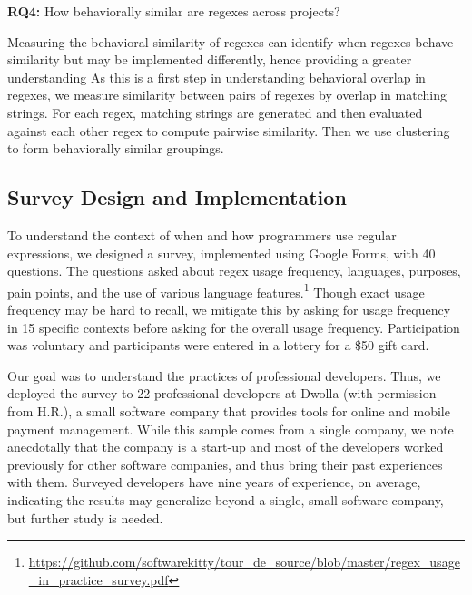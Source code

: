 \noindent \textbf{RQ4:} How behaviorally similar are regexes across projects?

Measuring the behavioral similarity of regexes can identify when regexes  behave similarity but may be implemented differently, hence providing a greater understanding 
As this is a first step in understanding behavioral overlap in
regexes, we measure similarity between pairs of regexes by overlap in matching strings. For each regex, matching strings are generated and then  evaluated against each other regex to compute pairwise similarity. Then we use clustering to form behaviorally similar groupings.

\subsection{Survey Design and Implementation}
\label{study:survey}
To understand the context of when and how programmers use regular expressions,
we designed a survey, implemented using Google Forms, with 40 questions. The questions asked about regex usage frequency, languages, purposes, pain points, and the use of various language
features.\footnote{\url{https://github.com/softwarekitty/tour_de_source/blob/master/regex_usage_in_practice_survey.pdf}}  Though exact usage frequency may be hard to recall, we mitigate this by asking for usage frequency in 15 specific contexts before asking for the overall usage frequency.
Participation was voluntary and participants were entered in a lottery for a \$50 gift card.

Our goal was to understand the practices of professional developers. Thus, we deployed the survey to 22 professional developers at Dwolla (with permission from H.R.), a small software company that provides tools for online and mobile payment management. While this sample comes from a single company, we note anecdotally that the company is a start-up and most of the developers worked previously for other software companies, and thus bring their past experiences with them. Surveyed developers have nine years of experience, on average, indicating the results may generalize beyond a single, small software company, but further study is needed.

